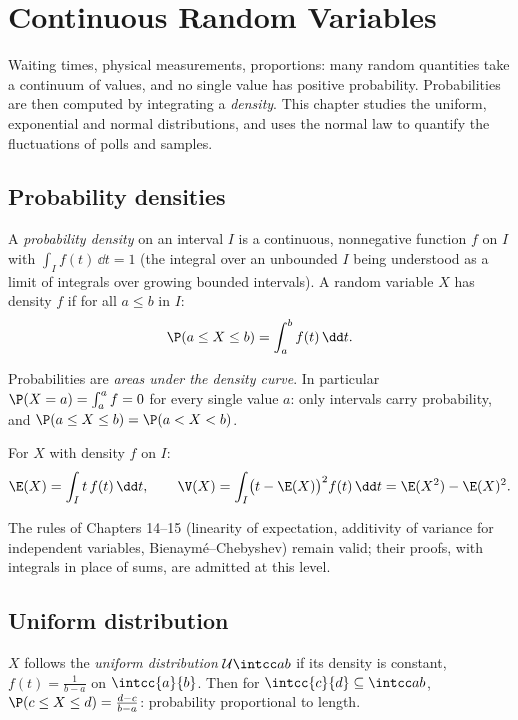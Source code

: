 \chapter{Continuous Random Variables}\label{ch:tle:contdist}

Waiting times, physical measurements, proportions: many random quantities
take a continuum of values, and no single value has positive probability.
Probabilities are then computed by integrating a \emph{density}. This
chapter studies the uniform, exponential and normal distributions, and uses
the normal law to quantify the fluctuations of polls and samples.

\section{Probability densities}

\begin{definition}\label{def:tle:contdist:density}
A \emph{probability density} on an interval $I$ is a
continuous, nonnegative function $f$ on $I$ with $\int_I f(t)\,\dd t = 1$
(the integral over an unbounded $I$ being understood as a limit of
integrals over growing bounded intervals). A random variable $X$ has
density $f$ if for all $a \leq b$ in $I$:
\[
\P(a \leq X \leq b) = \int_a^b f(t)\,\dd t .
\]
\end{definition}

Probabilities are \emph{areas under the density curve}. In particular
$\P(X = a) = \int_a^a f = 0$ for every single value $a$: only intervals
carry probability, and $\P(a \leq X \leq b) = \P(a < X < b)$.

\begin{definition}\label{def:tle:contdist:exp}
For $X$ with density $f$ on $I$:
\[
\E(X) = \int_I t\,f(t)\,\dd t, \qquad
\V(X) = \int_I \bigl(t - \E(X)\bigr)^2 f(t)\,\dd t
= \E(X^2) - \E(X)^2 .
\]
\end{definition}

The rules of Chapters 14--15 (linearity of expectation, additivity of
variance for independent variables, Bienaymé--Chebyshev) remain valid;
their proofs, with integrals in place of sums, are admitted at this level.

\section{Uniform distribution}

\begin{definition}\label{def:tle:contdist:uniform}
$X$ follows the \emph{uniform distribution}
$\mathcal U\intcc ab$ if its density is constant,
$f(t) = \frac{1}{b-a}$ on $\intcc{a}{b}$. Then for
$\intcc{c}{d} \subseteq \intcc ab$,
$\P(c \leq X \leq d) = \frac{d - c}{b - a}$: probability proportional to
length.
\end{definition}

